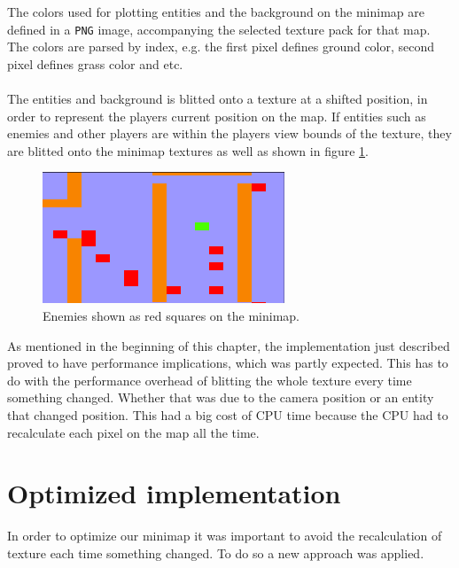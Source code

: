 The colors used for plotting entities and the background on the minimap are
defined in a \texttt{PNG} image, accompanying the selected texture pack for that
map. The colors are parsed by index, e.g. the first pixel defines ground
color, second pixel defines grass color and etc.
\\
\\
The entities and background is blitted onto a texture at a shifted position, in
order to represent the players current position on the map. If entities such as
enemies and other players are within the players view bounds of the
texture, they are blitted onto the minimap textures as well as shown in figure \ref{minimap:enemies}.
\\
\begin{figure}
	\centering
    \includegraphics[scale=.5]{figures/minimap/enemies_on_minimap.png}
    \caption{Enemies shown as red squares on the minimap.}
    \label{minimap:enemies}
\end{figure}

As mentioned in the beginning of this chapter, the implementation just
described proved to have performance implications, which was partly expected. 
This has to do with the performance overhead of blitting the whole texture every time something changed.
Whether that was due to the camera position or an entity that changed position.
This had a big cost of CPU time because the CPU had to recalculate each pixel on the map all the time.


\section{Optimized implementation}
In order to optimize our minimap it was important to avoid the recalculation of texture each time something changed.
To do so a new approach was applied.

